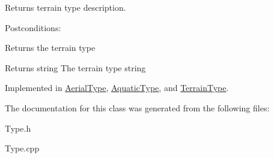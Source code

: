 Returns terrain type description. 

Postconditions\+:
\begin{DoxyItemize}
\item Returns the terrain type
\end{DoxyItemize}

\begin{DoxyReturn}{Returns}
string The terrain type string 
\end{DoxyReturn}


Implemented in \hyperlink{classAerialType_a66dd43f2688de9a5eab9c6de0396e9cc}{Aerial\+Type}, \hyperlink{classAquaticType_abb1b9ebdb96a352e0287f7a7cb803eab}{Aquatic\+Type}, and \hyperlink{classTerrainType_af24f4291676b6862c90b0d29598fcb11}{Terrain\+Type}.



The documentation for this class was generated from the following files\+:\begin{DoxyCompactItemize}
\item 
Type.\+h\item 
Type.\+cpp\end{DoxyCompactItemize}
